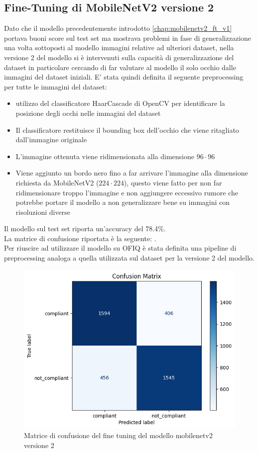\documentclass[12pt,a4paper,openright,twoside]{book}
\begin{document}
\subsection{Fine-Tuning di MobileNetV2 versione 2}
\label{chap:mobilenetv2_ft_v2}
Dato che il modello precedentemente introdotto \ref{chap:mobilenetv2_ft_v1} portava buoni score sul test set ma mostrava problemi in fase di generalizzazione una volta sottoposti al modello immagini relative ad ulteriori dataset, nella versione 2 del modello si è intervenuti sulla capacità di generalizzazione del dataset in particolare cercando di far valutare al modello il solo occhio dalle immagini del dataset iniziali.
E' stata quindi definita il seguente preprocessing per tutte le immagini del dataset: \begin{itemize}
    \item utilizzo del classificatore HaarCascade di OpenCV per identificare la posizione degli occhi nelle immagini del dataset
    \item Il classificatore restituisce il bounding box dell'occhio che viene ritagliato dall'immagine originale
    \item L'immagine ottenuta viene ridimensionata alla dimensione \(96 \cdot 96\)
    \item Viene aggiunto un bordo nero fino a far arrivare l'immagine alla dimensione richiesta da MobileNetV2 (\(224 \cdot 224\)), questo viene fatto per non far ridimensionare troppo l'immagine e non aggiungere eccessivo rumore che potrebbe portare il modello a non generalizzare bene su immagini con risoluzioni diverse
\end{itemize}
Il modello sul test set riporta un'accuracy del 78.4\%. \\
La matrice di confusione riportata è la seguente: . \\
Per riuscire ad utilizzare il modello su OFIQ è stata definita una pipeline di preprocessing analoga a quella utilizzata sul dataset per la versione 2 del modello.

\begin{figure}
    \centering
    \includegraphics[width=.6\linewidth]{figures/fine-tuning-mobilenetv2-version-2-confusion-matrix.png}
    \caption{Matrice di confusione del fine tuning del modello mobilenetv2 versione 2}
    \label{fig:fine_tuning_mobilenetv2_version_2_confusion_matrix}
\end{figure}
\end{document}
